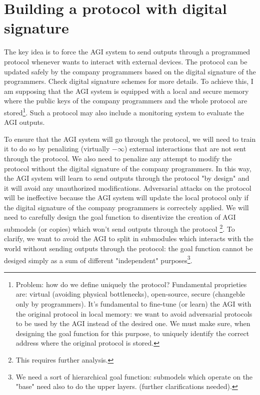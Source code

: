 \documentclass{article}
\begin{document}
\section{Building a protocol with digital signature}
The key idea is to force the AGI system to send outputs through a programmed protocol whenever wants to interact with external devices.
The protocol can be updated safely by the company programmers based on the digital signature of the programmers. Check digital signature schemes \cite{digital_signature} for more details.
To achieve this, I am supposing that the AGI system is equipped with a local and secure memory where the public keys of the company programmers and the whole protocol are stored\footnote{
Problem: how do we define uniquely the protocol? Fundamental proprieties are: virtual (avoiding physical bottlenecks), open-source, secure (changeble only by programmers).
It's fundamental to fine-tune (or learn) the AGI with the original protocol in local memory: we want to avoid adversarial 
protocols to be used by the AGI instead of the desired one. 
We must make sure, when designing the goal function for this purpose, to uniquely identify the correct address where the original protocol is stored.}.
Such a protocol may also include a monitoring system to evaluate the AGI outputs.

To ensure that the AGI system will go through the protocol, we will need to train it to do so by penalizing (virtually $-\infty$) external interactions that are not sent through the protocol.
We also need to penalize any attempt to modify the protocol without the digital signature of the company programmers.
In this way, the AGI system will learn to send outputs through the protocol "by design" and it will avoid any unauthorized modifications.
Adversarial attacks on the protocol will be ineffective because the AGI system will update the local protocol only if the digital signature of the company programmers is correctely applied.
We will need to carefully design the goal function to disentivize the creation of AGI submodels (or copies) which won't send outputs through the protocol \footnote{This requires further analysis.}. 
To clarify, we want to avoid the AGI to split in submodules which interacts with the world without sending outputs through the protocol: the goal function cannot be desiged simply as a sum of different
 "independent" purposes\footnote{We need a sort of hierarchical goal function: submodels which operate on the "base" need also to do the upper layers. (further clarifications needed).}.
\end{document}

